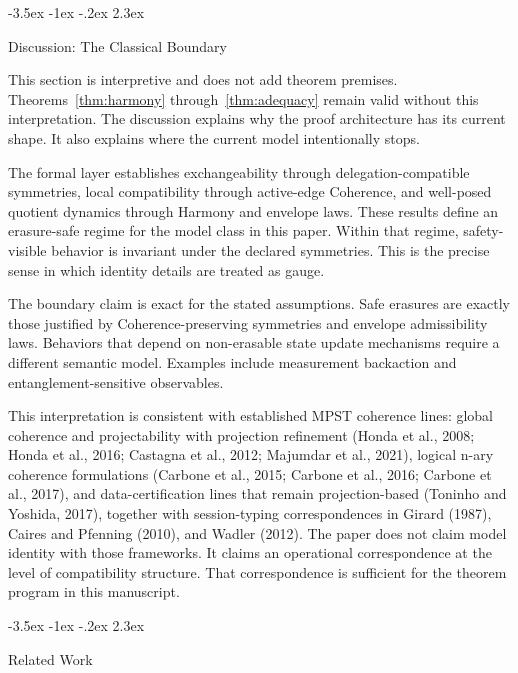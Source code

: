 \documentclass[a4paper,10pt,twocolumn,english]{article}
\makeatletter
\renewcommand{\section}{\@startsection{section}{1}{\z@}%
  {-3.5ex \@plus -1ex \@minus -.2ex}%
  {2.3ex}%
  {\raggedright\normalfont\large\bfseries}}
\numberwithin{equation}{section}
\theoremstyle{paperdef}
\theoremstyle{paperplain}
\theoremstyle{paperdef}
\theoremstyle{paperremark}
\theoremstyle{paperdef}
\makeatother
\begin{document}
\section{Discussion: The Classical Boundary}
\label{sec:discussion}

This section is interpretive and does not add theorem premises. Theorems~\ref{thm:harmony} through~\ref{thm:adequacy} remain valid without this interpretation. The discussion explains why the proof architecture has its current shape. It also explains where the current model intentionally stops.

The formal layer establishes exchangeability through delegation-compatible symmetries, local compatibility through active-edge Coherence, and well-posed quotient dynamics through Harmony and envelope laws. These results define an erasure-safe regime for the model class in this paper. Within that regime, safety-visible behavior is invariant under the declared symmetries. This is the precise sense in which identity details are treated as gauge.

The boundary claim is exact for the stated assumptions. Safe erasures are exactly those justified by Coherence-preserving symmetries and envelope admissibility laws. Behaviors that depend on non-erasable state update mechanisms require a different semantic model. Examples include measurement backaction and entanglement-sensitive observables.

This interpretation is consistent with established MPST coherence lines: global coherence and
projectability with projection refinement (Honda et al., 2008; Honda et al., 2016; Castagna et al., 2012; Majumdar et al., 2021), logical n-ary coherence formulations
(Carbone et al., 2015; Carbone et al., 2016; Carbone et al., 2017), and data-certification lines that
remain projection-based (Toninho and Yoshida, 2017), together with session-typing correspondences in
Girard (1987), Caires and Pfenning (2010), and Wadler (2012). The paper does not claim model identity
with those frameworks. It claims an operational correspondence at the level of compatibility structure.
That correspondence is sufficient for the theorem program in this manuscript.

\section{Related Work}
\label{sec:related}
\end{document}
